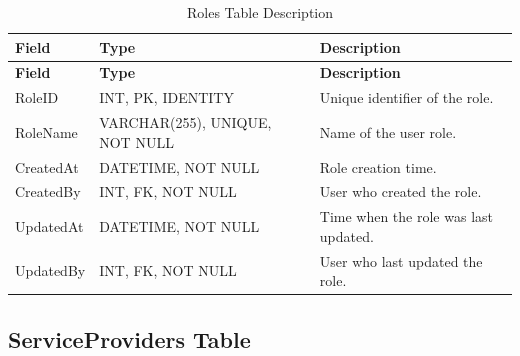 \begin{longtable}{
		|>{\raggedright\arraybackslash}p{3.2cm}|
		>{\raggedright\arraybackslash}p{4.2cm}|
		>{\raggedright\arraybackslash}p{5.0cm}|
	}
	\caption{Roles Table Description}
	\label{tab:roles}\\
	\hline
	\textbf{Field} & \textbf{Type} & \textbf{Description} \\ \hline
	\endfirsthead
	\hline
	\textbf{Field} & \textbf{Type} & \textbf{Description} \\ \hline
	\endhead
	
	RoleID & INT, PK, IDENTITY &
	Unique identifier of the role. \\ \hline
	
	RoleName & VARCHAR(255), UNIQUE, NOT NULL &
	Name of the user role. \\ \hline
	
	CreatedAt & DATETIME, NOT NULL &
	Role creation time. \\ \hline
	
	CreatedBy & INT, FK, NOT NULL &
	User who created the role. \\ \hline
	
	UpdatedAt & DATETIME, NOT NULL &
	Time when the role was last updated. \\ \hline
	
	UpdatedBy & INT, FK, NOT NULL &
	User who last updated the role. \\ \hline
	
\end{longtable}


\subsection{ServiceProviders Table}

